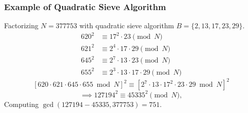 \begin{frame}\frametitle{Example of Quadratic Sieve Algorithm}
\begin{exampleblock}{Factorizing $N=377753$ with quadratic sieve algorithm}
$B = \{2,13,17,23,29\}$.
\begin{align*}
620^2 &\equiv 17^2\cdot 23 \pmod N\\
621^2 &\equiv 2^4\cdot 17\cdot 29 \pmod N\\
645^2 &\equiv 2^7\cdot 13\cdot 23 \pmod N\\
655^2 &\equiv 2^3\cdot 13\cdot 17\cdot 29 \pmod N
\end{align*}
\[ [620\cdot 621\cdot 645\cdot 655 \bmod N]^2 \equiv [2^7\cdot 13\cdot 17^2\cdot 23\cdot 29\bmod N]^2 \]
\[ \implies 127194^2 \equiv 45335^2 \pmod N,\]
Computing $\gcd(127194-45335,377753)=751$.
\end{exampleblock}
\end{frame}
